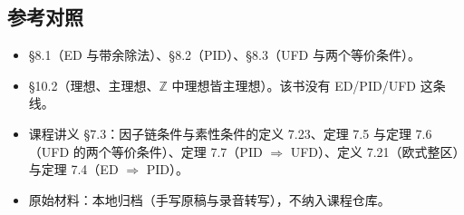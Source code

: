 \subsection{参考对照}


\begin{itemize}
\item [DF] §8.1（ED 与带余除法）、§8.2（PID）、§8.3（UFD 与两个等价条件）。
\item [DS] §10.2（理想、主理想、$\mathbb Z$ 中理想皆主理想）。该书没有 ED/PID/UFD 这条线。
\item 课程讲义 §7.3：因子链条件与素性条件的定义 7.23、定理 7.5 与定理 7.6（UFD 的两个等价条件）、定理 7.7（PID $\Rightarrow$ UFD）、定义 7.21（欧式整区）与定理 7.4（ED $\Rightarrow$ PID）。
\item 原始材料：本地归档（手写原稿与录音转写），不纳入课程仓库。
\end{itemize}
